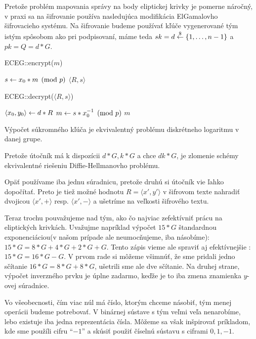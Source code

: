 Pretože problém mapovania správy na body eliptickej krivky je pomerne
náročný, v praxi sa na šifrovanie používa nasledujúca modifikácia
ElGamalovho šifrovacieho systému. Na šifrovanie budeme používať
kľúče vygenerované tým istým spôsobom ako pri podpisovaní, máme teda
$sk=d \overset{\$}{\leftarrow} \{1,\dots,n-1\}$ a $pk=Q=d*G$.

\begin{procedure}[H]
    \caption{ECEG::encrypt($m$)}
    $ s \leftarrow x_0 * m \pmod{p}$ \;
    \Return $\langle R, s \rangle$ \;
\end{procedure}

\begin{procedure}[H]
    \caption{ECEG::decrypt($\langle R, s\rangle$)}
    $\langle x_0, y_0 \rangle \leftarrow d*R$ \;
    $ m \leftarrow  s * x_0^{-1} \pmod{p}$ \;
    \Return $m$ \;
\end{procedure}

\begin{poznamka}
    Výpočet súkromného kľúča je ekvivalentný problému diskrétneho
    logaritmu v danej grupe.
\end{poznamka}
\begin{poznamka}
    Pretože útočník má k dispozícii $d*G, k*G$ a chce $dk*G$, je
    zlomenie schémy ekvivalentné riešeniu Diffie-Hellmanovho problému.
\end{poznamka}
\begin{poznamka}
    Opäť používame iba jednu súradnicu, pretože druhú si útočník vie
    ľahko dopočítať. Preto je tiež možné hodnotu
    $R = \langle x', y' \rangle$ v šifrovom texte nahradiť dvojicou
    $\langle x', + \rangle$ resp. $\langle x', - \rangle$
    a ušetríme na veľkosti šifrového textu.
\end{poznamka}

Teraz trochu pouvažujeme nad tým, ako čo najviac zefektívniť prácu na
eliptických krivkách. Uvažujme napríklad výpočet $15*G$ štandardnou
exponenciáciou(v našom prípade ale neumocňujeme, iba násobíme):
$15*G = 8*G + 4*G + 2*G + G$. Tento zápis vieme ale spraviť aj
efektívnejšie : $15*G = 16*G - G$. V prvom rade si môžeme všimnúť, že
sme pridali jedno sčítanie $16*G = 8*G + 8*G$, ušetrili sme ale dve
sčítanie. Na druhej strane, výpočet inverzného prvku je úplne zadarmo,
keďže je to iba zmena znamienka $y$-ovej súradnice.

Vo všeobecnosti, čím viac núl má číslo, ktorým chceme
násobiť, tým menej operácii budeme potrebovať. V binárnej sústave s
tým veľmi veľa nenarobíme, lebo existuje iba jedna reprezentácia
čísla. Môžeme sa však inšpirovať príkladom, kde sme použíli cifru
``$-1$'' a skúsiť použiť číselnú sústavu s ciframi $0,1,-1$.

